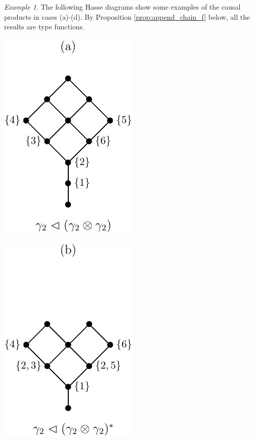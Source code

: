\documentclass[12pt]{article}
\theoremstyle{definition}
\theoremstyle{remark}
\newtheorem{exm}{Example}
\begin{document}
\begin{exm}
The following Hasse diagrams show some examples of the causal products in cases (a)-(d).
By  Proposition
\ref{prop:append_chain_f} below, all the results are type functions. 

\begin{center}
\begin{minipage}[c]{0.23\textwidth}
\centering
\includegraphics[scale=0.7]{vtl_a.pdf}
\end{minipage}
\begin{minipage}[c]{0.23\textwidth}
\centering
\includegraphics[scale=0.7]{vtl_b.pdf}
\end{minipage}
\begin{minipage}[c]{0.23\textwidth}

\end{minipage}
\end{center}
\end{exm}
\end{document}
